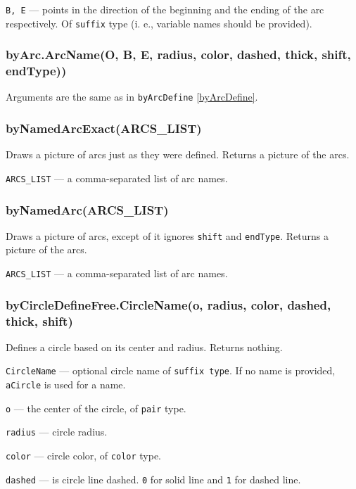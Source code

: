 \documentclass{ltxdoc}
\begin{document}
	\texttt{B, E} — points in the direction of the beginning and the ending of the arc respectively. Of \texttt{suffix} type (i. e., variable names should be provided).

\subsubsection{byArc.ArcName(O, B, E, radius, color, dashed, thick, shift, endType))}\label{byArc}
	
	Arguments are the same as in \texttt{byArcDefine} \ref{byArcDefine}.
	
\subsubsection{byNamedArcExact(ARCS\_LIST)}\label{byNamedArcExact}
	Draws a picture of arcs just as they were defined. Returns a picture of the arcs.
	
	\texttt{ARCS\_LIST} — a comma-separated list of arc names.
	
\subsubsection{byNamedArc(ARCS\_LIST)}\label{byNamedArc}
	Draws a picture of arcs, except of it ignores \texttt{shift} and \texttt{endType}. Returns a picture of the arcs.
	
	\texttt{ARCS\_LIST} — a comma-separated list of arc names.


\subsubsection{byCircleDefineFree.CircleName(o, radius, color, dashed, thick, shift)}\label{byCircleDefineFree}
	
	Defines a circle based on its center and radius. Returns nothing.
	
	\texttt{CircleName} — optional circle name of \texttt{suffix type}. If no name is provided, \texttt{aCircle} is used for a name.
	
	\texttt{o} — the center of the circle, of \texttt{pair} type.
	
	\texttt{radius} — circle radius.
	
	\texttt{color} — circle color, of \texttt{color} type.
	
	\texttt{dashed} — is circle line dashed. \texttt{0} for solid line and \texttt{1} for dashed line.
	
\end{document}

